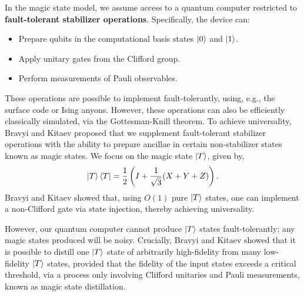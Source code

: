 \documentclass[11pt]{article}
\def\bra#1{\mathinner{\langle{#1}|}}
\def\ket#1{\mathinner{|{#1}\rangle}}
\begin{document}
In the magic state model, we assume access to a quantum computer restricted to \textbf{fault-tolerant stabilizer operations}. Specifically, the device can:
\begin{itemize}
    \item Prepare qubits in the computational basis states $\ket{0}$ and $\ket{1}$.
    \item Apply unitary gates from the Clifford group.
    \item Perform measurements of Pauli observables.
\end{itemize}
These operations are possible to implement fault-tolerantly, using, e.g., the surface code or Ising anyons. However, these operations can also be efficiently classically simulated, via the Gottesman-Knill theorem\cite{aaronson2004improved}.
To achieve universality, Bravyi and Kitaev proposed that we supplement fault-tolerant stabilizer operations with the ability to prepare ancillae in certain non-stabilizer states known as magic states. We focus on the magic state $\ket{T}$, given by,
\begin{equation}    \ket{T}\bra{T} =  \frac{1}{2}\left( I+ \frac{1}{\sqrt{3}} (X+Y+Z) \right).
\end{equation}Bravyi and Kitaev showed that, using $O(1)$ pure $\ket{T}$ states, one can implement a non-Clifford gate via state injection, thereby achieving universality. 

However, our quantum computer cannot produce $\ket{T}$ states fault-tolerantly; any magic states produced will be noisy. Crucially, Bravyi and Kitaev showed that it is possible to distill one $\ket{T}$ state of arbitrarily high-fidelity from many low-fidelity $\ket{T}$ states, provided that the fidelity of the input states exceeds a critical threshold, via a process only involving Clifford unitaries and Pauli measurements, known as magic state distillation. 
\end{document}
